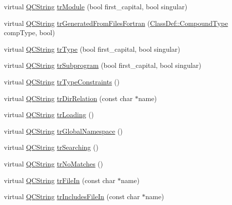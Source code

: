 \begin{DoxyCompactItemize}
virtual \mbox{\hyperlink{class_q_c_string}{Q\+C\+String}} \mbox{\hyperlink{class_translator_croatian_ad68309492bd413275f9056ff5f2ef5aa}{tr\+Module}} (bool first\+\_\+capital, bool singular)
\item 
virtual \mbox{\hyperlink{class_q_c_string}{Q\+C\+String}} \mbox{\hyperlink{class_translator_croatian_afd13c496f152991572102637abdd0a66}{tr\+Generated\+From\+Files\+Fortran}} (\mbox{\hyperlink{class_class_def_ae70cf86d35fe954a94c566fbcfc87939}{Class\+Def\+::\+Compound\+Type}} comp\+Type, bool)
\item 
virtual \mbox{\hyperlink{class_q_c_string}{Q\+C\+String}} \mbox{\hyperlink{class_translator_croatian_ac2d6cc18fc740ca01b2ad50d747c9935}{tr\+Type}} (bool first\+\_\+capital, bool singular)
\item 
virtual \mbox{\hyperlink{class_q_c_string}{Q\+C\+String}} \mbox{\hyperlink{class_translator_croatian_ab5ccf8dd56048e10158a0ad5c528087c}{tr\+Subprogram}} (bool first\+\_\+capital, bool singular)
\item 
virtual \mbox{\hyperlink{class_q_c_string}{Q\+C\+String}} \mbox{\hyperlink{class_translator_croatian_af81d5be2e3456c26a74b2680e37a51b0}{tr\+Type\+Constraints}} ()
\item 
virtual \mbox{\hyperlink{class_q_c_string}{Q\+C\+String}} \mbox{\hyperlink{class_translator_croatian_a79721807827d60578646eb4002723bda}{tr\+Dir\+Relation}} (const char $\ast$name)
\item 
virtual \mbox{\hyperlink{class_q_c_string}{Q\+C\+String}} \mbox{\hyperlink{class_translator_croatian_a8132d4a84802c0fa136e950b12519919}{tr\+Loading}} ()
\item 
virtual \mbox{\hyperlink{class_q_c_string}{Q\+C\+String}} \mbox{\hyperlink{class_translator_croatian_a6ab170ee62500c65bdee276622b99e25}{tr\+Global\+Namespace}} ()
\item 
virtual \mbox{\hyperlink{class_q_c_string}{Q\+C\+String}} \mbox{\hyperlink{class_translator_croatian_a243180cf0268eaad696f4fc0373465a6}{tr\+Searching}} ()
\item 
virtual \mbox{\hyperlink{class_q_c_string}{Q\+C\+String}} \mbox{\hyperlink{class_translator_croatian_a829bcd344be0a07c509a7828f7cca3d9}{tr\+No\+Matches}} ()
\item 
virtual \mbox{\hyperlink{class_q_c_string}{Q\+C\+String}} \mbox{\hyperlink{class_translator_croatian_ada21cc324490f28413f2369c2bfe3251}{tr\+File\+In}} (const char $\ast$name)
\item 
virtual \mbox{\hyperlink{class_q_c_string}{Q\+C\+String}} \mbox{\hyperlink{class_translator_croatian_a5ca15edc2f650155561cb3a4e409e5a7}{tr\+Includes\+File\+In}} (const char $\ast$name)

\end{DoxyCompactItemize}
